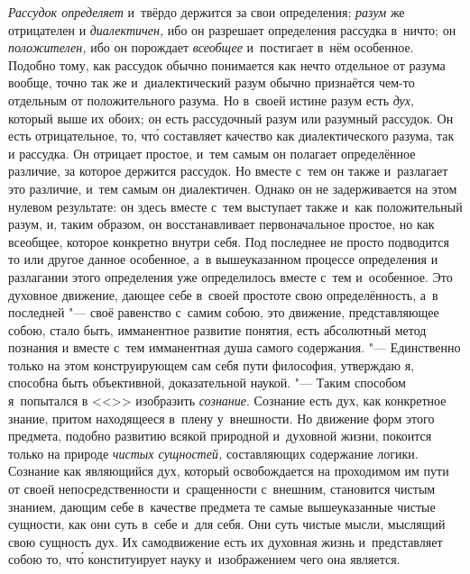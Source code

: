 {\em Рассудок определяет} и~твёрдо держится за свои определения; {\em разум} же
отрицателен и {\em диалектичен,} ибо он разрешает определения рассудка в~ничто;
он {\em положителен,} ибо он порождает {\em всеобщее} и~постигает в~нём
особенное. Подобно тому, как рассудок обычно понимается как нечто отдельное от
разума вообще, точно так же и~диалектический разум обычно признаётся чем-то
отдельным от положительного разума. Но в~своей истине разум есть {\em дух,}
который выше их обоих; он есть рассудочный разум или разумный рассудок. Он есть
отрицательное, то, чт\'{о} составляет качество как диалектического разума, так
и рассудка. Он отрицает простое, и~тем самым он полагает определённое различие,
за которое держится рассудок. Но вместе с~тем он также и~разлагает это
различие, и~тем самым он диалектичен. Однако он не задерживается на этом
нулевом результате: он здесь вместе с~тем выступает также и~как положительный
разум, и, таким образом, он восстанавливает первоначальное простое, но как
всеобщее, которое конкретно внутри себя. Под последнее не просто подводится то
или другое данное особенное, а~в вышеуказанном процессе определения и
разлагании этого определения уже определилось вместе с~тем и~особенное. Это
духовное движение, дающее себе в~своей простоте свою определённость, а~в
последней "--- своё равенство с~самим собою, это движение, представляющее
собою, стало быть, имманентное развитие понятия, есть абсолютный метод познания
и вместе с~тем имманентная душа самого содержания. "--- Единственно только на
этом конструирующем сам себя пути философия, утверждаю я, способна быть
объективной, доказательной наукой. "--- Таким способом я~попытался в
<<>> изобразить {\em сознание}. Сознание есть дух, как
конкретное знание, притом находящееся в~плену у~внешности. Но движение форм
этого предмета, подобно развитию всякой природной и~духовной жизни, покоится
только на природе {\em чистых сущностей,} составляющих содержание логики.
Сознание как являющийся дух, который освобождается на проходимом им пути от
своей непосредственности и~сращенности с~внешним, становится чистым знанием,
дающим себе в~качестве предмета те самые вышеуказанные чистые сущности, как они
суть в~себе и~для себя. Они суть чистые мысли, мыслящий свою сущность дух. Их
самодвижение есть их духовная жизнь и~представляет собою то, чт\'{о}
конституирует науку и~изображением чего она является.

